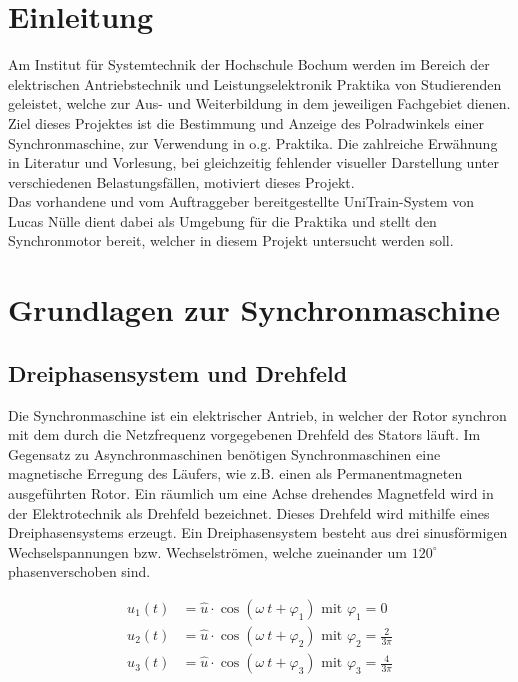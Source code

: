 



\chapter{Einleitung}
\label{chap:Zielsetzung}

Am Institut für Systemtechnik der Hochschule Bochum werden im Bereich der elektrischen Antriebstechnik und Leistungselektronik Praktika von Studierenden geleistet, welche zur Aus- und Weiterbildung in dem jeweiligen Fachgebiet dienen.\\

Ziel dieses Projektes ist die Bestimmung und Anzeige des Polradwinkels einer Synchronmaschine, zur Verwendung in o.g. Praktika.
Die zahlreiche Erwähnung in Literatur und Vorlesung, bei gleichzeitig fehlender visueller Darstellung unter verschiedenen Belastungsfällen, motiviert dieses Projekt. \cite{schroeder,albach,bergmann}\\

Das vorhandene und vom Auftraggeber bereitgestellte UniTrain-System  \cite{unitrain} von Lucas Nülle dient dabei als Umgebung für die Praktika und stellt den Synchronmotor bereit, welcher in diesem Projekt untersucht werden soll.

\chapter{Grundlagen zur Synchronmaschine}

\section{Dreiphasensystem und Drehfeld}

Die Synchronmaschine ist ein elektrischer Antrieb, in welcher der Rotor synchron mit dem durch die Netzfrequenz vorgegebenen Drehfeld des Stators läuft. Im Gegensatz zu Asynchronmaschinen benötigen Synchronmaschinen eine magnetische Erregung des Läufers, wie z.B. einen als Permanentmagneten ausgeführten Rotor. Ein räumlich um eine Achse drehendes Magnetfeld wird in der Elektrotechnik als Drehfeld bezeichnet. Dieses Drehfeld wird mithilfe eines Dreiphasensystems erzeugt.
Ein Dreiphasensystem besteht aus drei sinusförmigen Wechselspannungen bzw. Wechselströmen, welche zueinander um \(120^\circ\) phasenverschoben sind. \cite{schroeder,	weissgerber}

\begin{align*}
u_1(t) &= \hat{u}\cdot \cos(\omega\:t+\varphi_1) \text{ mit } \varphi_1 = 0\\
u_2(t) &= \hat{u}\cdot \cos(\omega\:t+\varphi_2) \text{ mit } \varphi_2 = \frac{2}{3\pi}\\
u_3(t) &= \hat{u}\cdot \cos(\omega\:t+\varphi_3) \text{ mit } \varphi_3 =\frac{4}{3\pi}
\end{align*}

